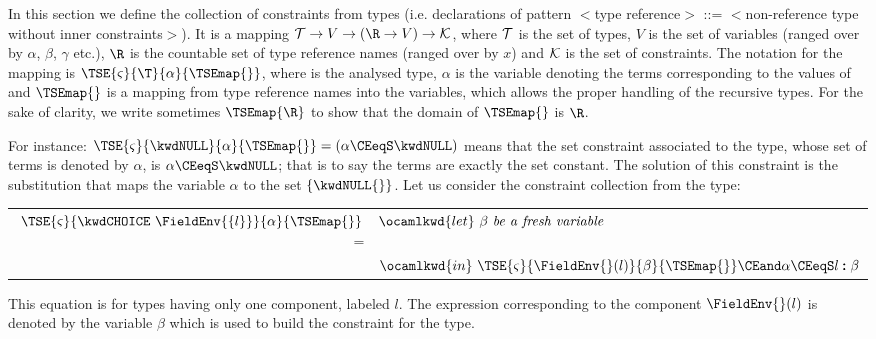 
In this section we define the collection of constraints from types
(i.e. declarations of pattern {\small $<$\textsf{type reference}$>$
\textsf{::=} $<$\textsf{non-reference type without inner
constraints}$>$}). It is a mapping ${\cal T} \rightarrow V \rightarrow
(\R \rightarrow V) \rightarrow {\cal K}$, where ${\cal T}$ is the set
of types, $V$ is the set of variables (ranged over by $\alpha$,
$\beta$, $\gamma$ etc.), $\R$ is the countable set of type reference
names (ranged over by $x$) and ${\cal K}$ is the set of
constraints. The notation for the mapping is
$\TSE{\varsigma}{\T}{\alpha}{\TSEmap{}}$, where \T{} is the analysed
type, $\alpha$ is the variable denoting the terms corresponding to the
values of \T{} and $\TSEmap{}$ is a mapping from type reference names
into the variables, which allows the proper handling of the recursive
types. For the sake of clarity, we write sometimes $\TSEmap{\R}$ to
show that the domain of $\TSEmap{}$ is $\R$.

For instance: $\TSE{\varsigma}{\kwdNULL}{\alpha}{\TSEmap{}} = (\alpha
\CEeqS \kwdNULL)$ means that the set constraint associated to the
\kwdNULL{} type, whose set of terms is denoted by $\alpha$, is $\alpha
\CEeqS \kwdNULL$; that is to say the terms are exactly the \kwdNULL{} set
constant. The solution of this constraint is the substitution that
maps the variable $\alpha$ to the set $\{\kwdNULL{}\}$. Let us consider
the constraint collection from the \kwdCHOICE{} type:

\begin{center}
\begin{tabular}{rl}
$\TSE{\varsigma}{\kwdCHOICE \,\,
    \FieldEnv{\{l\}}}{\alpha}{\TSEmap{}}$ = 
 & \hspace*{-3mm}
   $\ocamlkwd{let} \,\, \beta \,\, \emph{be a fresh variable}$\\ 
 & \hspace*{-3mm}
   $\ocamlkwd{in} \,\,
   \TSE{\varsigma}{\FieldEnv{}(l)}{\beta}{\TSEmap{}} 
   \CEand 
   \alpha \CEeqS l \pmb{:} \beta$
\end{tabular}
\end{center}

This equation is for \kwdCHOICE{} types having only one component,
labeled $l$. The expression corresponding to the component
$\FieldEnv{}(l)$ is denoted by the variable $\beta$ which is used to
build the constraint for the \kwdCHOICE{} type.

\medskip

